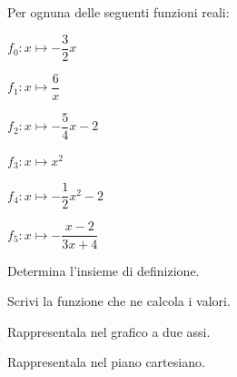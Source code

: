 \begin{esercizio}\label{ese:03.1}
Per ognuna delle seguenti funzioni reali:

\begin{enumeratea}
\item $f_0: x \mapsto - \dfrac{3}{2} x$
\item $f_1: x \mapsto \dfrac{6}{x}$
\item $f_2: x \mapsto - \dfrac{5}{4} x -2$
\item $f_3: x \mapsto x^2$
\item $f_4: x \mapsto - \dfrac{1}{2} x^2 -2$
\item $f_5: x \mapsto - \dfrac{x-2}{3x+4}$
\end{enumeratea}


\begin{enumeratea}
\item Determina l'insieme di definizione.
\item Scrivi la funzione che ne calcola i valori.
\item Rappresentala nel grafico a due assi.
\item Rappresentala nel piano cartesiano.
\end{enumeratea}
\end{esercizio}


